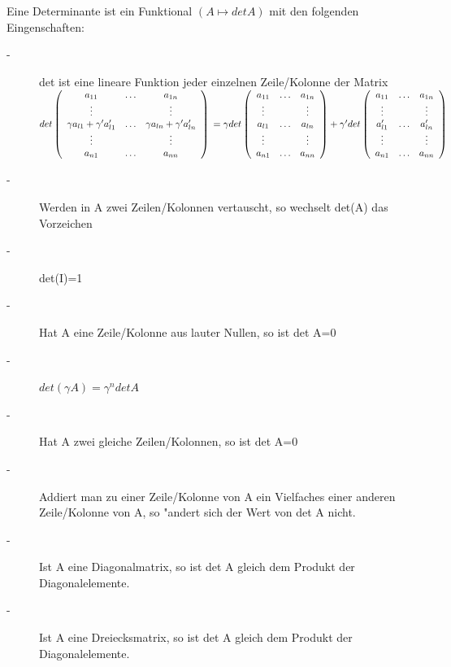 \documentclass[10pt, a4paper, twocolumn]{scrartcl}
\begin{document}
Eine Determinante ist ein Funktional $(A\mapsto det A)$ mit den folgenden Eingenschaften:\\
\begin{description}
 \item[-] det ist eine lineare Funktion jeder einzelnen Zeile/Kolonne der Matrix\\
\tiny
$
det \left (
\begin{array}{ccc}
a_{11} & \ldots & a_{1n}\\
\vdots &        & \vdots\\
\gamma a_{l1} + \gamma' a'_{l1} & \ldots & \gamma a_{ln} +\gamma' a'_{ln}\\
\vdots &        & \vdots\\
a_{n1} & \ldots & a_{nn}
\end{array}
\right )\\
=\gamma 
det \left (
\begin{array}{ccc}
a_{11} &  \ldots & a_{1n}\\
\vdots &         & \vdots\\
a_{l1} &  \ldots & a_{ln} \\
\vdots &         & \vdots\\
a_{n1} &  \ldots & a_{nn}
\end{array}
\right )
+\gamma' 
det \left (
\begin{array}{ccc}
a_{11} &  \ldots & a_{1n}\\
\vdots &         & \vdots\\
a'_{l1} &  \ldots & a'_{ln} \\
\vdots &         & \vdots\\
a_{n1} &  \ldots & a_{nn}
\end{array}
\right )
$
\normalsize
 \item[-] Werden in A zwei Zeilen/Kolonnen vertauscht, so wechselt det(A) das Vorzeichen
 \item[-] det(I)=1
 \item[-] Hat A eine Zeile/Kolonne aus lauter Nullen, so ist det A=0
 \item[-] $det(\gamma A)=\gamma^n det A$\\
 \item[-] Hat A zwei gleiche Zeilen/Kolonnen, so ist det A=0\\
 \item[-] Addiert man zu einer Zeile/Kolonne von A ein Vielfaches einer anderen Zeile/Kolonne von A, so "andert sich der Wert von det A nicht.
 \item[-] Ist A eine Diagonalmatrix, so ist det A gleich dem Produkt der Diagonalelemente.
 \item[-] Ist A eine Dreiecksmatrix, so ist det A gleich dem Produkt der Diagonalelemente.
\end{description}
\end{document}
